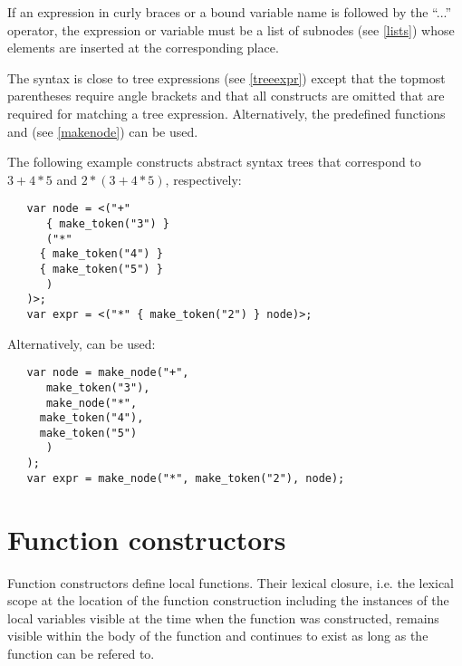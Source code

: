 If an expression in curly braces or a bound variable name is followed
by the ``...'' operator, the expression or variable must be a list of
subnodes (see \ref{lists}) whose elements are inserted at the
corresponding place.

The syntax is close to tree expressions (see \ref{treeexpr}) except
that the topmost parentheses require angle brackets and that all
constructs are omitted that are required for matching a tree expression.
Alternatively, the predefined functions 
and  (see \ref{makenode}) can be used.

The following example constructs abstract syntax trees that correspond to
$3 + 4 * 5$ and $2 * (3 + 4 * 5)$, respectively:

\begin{lstlisting}
   var node = <("+"
      { make_token("3") }
      ("*"
	 { make_token("4") }
	 { make_token("5") }
      )
   )>;
   var expr = <("*" { make_token("2") } node)>;
\end{lstlisting}

\noindent
Alternatively,  can be used:

\begin{lstlisting}
   var node = make_node("+",
      make_token("3"),
      make_node("*",
	 make_token("4"),
	 make_token("5")
      )
   );
   var expr = make_node("*", make_token("2"), node);
\end{lstlisting}

\section{Function constructors}\label{funcon}

Function constructors define local functions.
Their lexical closure,
i.e. the lexical scope at the location of the function construction
including the instances of the local variables visible at the time
when the function was constructed, remains visible within
the body of the function and continues to exist as long as the function
can be refered to.

\begin{grammar}
      \produces {}  \\
      \produces {} 
	  \\
      \produces \lextoken{(} \lextoken{)} \\
      \produces \lextoken{(} 
	 \lextoken{)} \\
      \produces {} \\
      \produces {} \lextoken{,}
\end{grammar}

